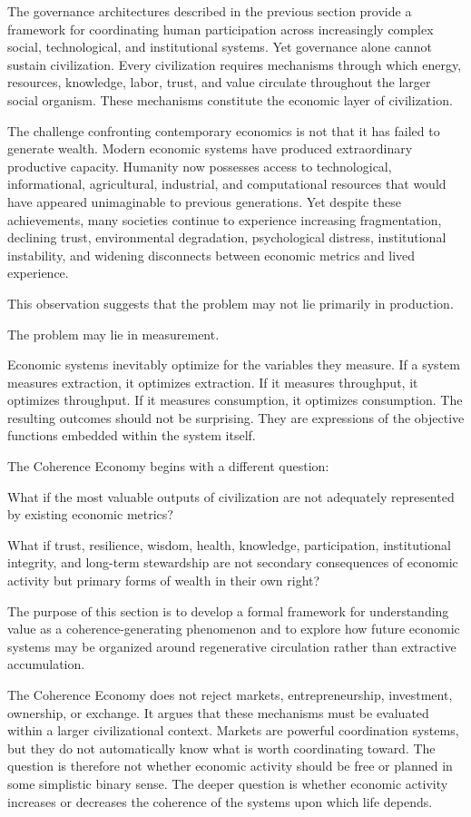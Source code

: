 \documentclass[12pt]{article}
\begin{document}
The governance architectures described in the previous section provide a framework for coordinating human participation across increasingly complex social, technological, and institutional systems. Yet governance alone cannot sustain civilization. Every civilization requires mechanisms through which energy, resources, knowledge, labor, trust, and value circulate throughout the larger social organism. These mechanisms constitute the economic layer of civilization.

The challenge confronting contemporary economics is not that it has failed to generate wealth. Modern economic systems have produced extraordinary productive capacity. Humanity now possesses access to technological, informational, agricultural, industrial, and computational resources that would have appeared unimaginable to previous generations. Yet despite these achievements, many societies continue to experience increasing fragmentation, declining trust, environmental degradation, psychological distress, institutional instability, and widening disconnects between economic metrics and lived experience.

This observation suggests that the problem may not lie primarily in production.

The problem may lie in measurement.

Economic systems inevitably optimize for the variables they measure. If a system measures extraction, it optimizes extraction. If it measures throughput, it optimizes throughput. If it measures consumption, it optimizes consumption. The resulting outcomes should not be surprising. They are expressions of the objective functions embedded within the system itself.

The Coherence Economy begins with a different question:

What if the most valuable outputs of civilization are not adequately represented by existing economic metrics?

What if trust, resilience, wisdom, health, knowledge, participation, institutional integrity, and long-term stewardship are not secondary consequences of economic activity but primary forms of wealth in their own right?

The purpose of this section is to develop a formal framework for understanding value as a coherence-generating phenomenon and to explore how future economic systems may be organized around regenerative circulation rather than extractive accumulation.

The Coherence Economy does not reject markets, entrepreneurship, investment, ownership, or exchange. It argues that these mechanisms must be evaluated within a larger civilizational context. Markets are powerful coordination systems, but they do not automatically know what is worth coordinating toward. The question is therefore not whether economic activity should be free or planned in some simplistic binary sense. The deeper question is whether economic activity increases or decreases the coherence of the systems upon which life depends.
\end{document}
